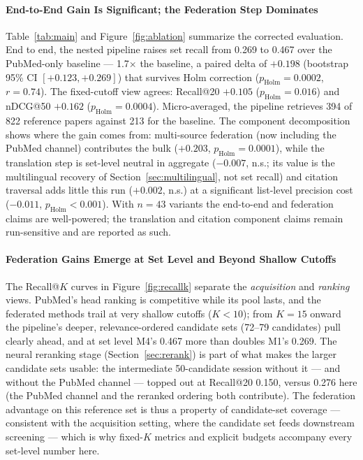 \documentclass[nonacm,sigconf]{acmart}
\begin{document}
\paragraph{End-to-End Gain Is Significant; the Federation Step Dominates}
Table~\ref{tab:main} and Figure~\ref{fig:ablation} summarize the corrected
evaluation. End to end, the nested pipeline raises set recall from 0.269
to 0.467 over the PubMed-only baseline --- 1.7$\times$ the baseline, a
paired delta of $+0.198$ (bootstrap 95\% CI $[+0.123, +0.269]$) that
survives Holm correction ($p_{\text{Holm}}{=}0.0002$, $r{=}0.74$). The
fixed-cutoff view agrees: Recall@20 $+0.105$
($p_{\text{Holm}}{=}0.016$) and nDCG@50 $+0.162$
($p_{\text{Holm}}{=}0.0004$). Micro-averaged, the pipeline retrieves 394
of 822 reference papers against 213 for the baseline. The component
decomposition shows where the gain comes from: multi-source federation
(now including the PubMed channel) contributes the bulk
($+0.203$, $p_{\text{Holm}}{=}0.0001$), while the translation step is
set-level neutral in aggregate ($-0.007$, n.s.; its value is the
multilingual recovery of Section~\ref{sec:multilingual}, not set recall)
and citation traversal adds little this run ($+0.002$, n.s.) at a
significant list-level precision cost ($-0.011$,
$p_{\text{Holm}}{<}0.001$). With $n{=}43$ variants the end-to-end and
federation claims are well-powered; the translation and citation component
claims remain run-sensitive and are reported as such.

\paragraph{Federation Gains Emerge at Set Level and Beyond Shallow Cutoffs}
The Recall@$K$ curves in Figure~\ref{fig:recallk} separate the
\emph{acquisition} and \emph{ranking} views. PubMed's head ranking is
competitive while its pool lasts, and the federated methods trail at very
shallow cutoffs ($K{<}10$); from $K{=}15$ onward the pipeline's deeper,
relevance-ordered candidate sets (72--79 candidates) pull clearly ahead,
and at set level M4's 0.467 more than doubles M1's 0.269. The neural
reranking stage (Section~\ref{sec:rerank}) is part of what
makes the larger candidate sets usable: the intermediate 50-candidate
session without it --- and without the PubMed channel --- topped out at
Recall@20 0.150, versus 0.276 here (the PubMed channel and the reranked
ordering both contribute). The federation advantage on this reference set
is thus a property of candidate-set coverage --- consistent with the
acquisition setting, where the candidate set feeds downstream screening
--- which is why fixed-$K$ metrics and explicit budgets accompany every
set-level number here.
\end{document}
